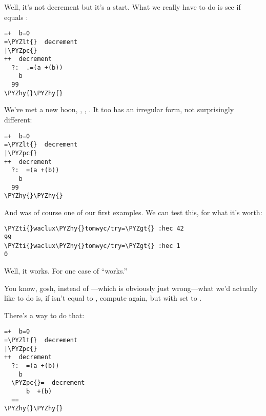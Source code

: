 Well, it's not decrement but it's a start.  What we really have
to do is see if  equals :
\begin{framed_shaded}
\begin{Verbatim}[fontsize=\relsize{-2.5},fontseries=b,commandchars=\\\{\}]
=+  b=0
=\PYZlt{}  decrement
|\PYZpc{}
++  decrement
  ?:  .=(a +(b))
    b
  99
\PYZhy{}\PYZhy{}
\end{Verbatim}
\end{framed_shaded}

We've met a new hoon, , , .  It too has an
irregular form, not surprisingly different:
\begin{framed_shaded}
\begin{Verbatim}[fontsize=\relsize{-2.5},fontseries=b,commandchars=\\\{\}]
=+  b=0
=\PYZlt{}  decrement
|\PYZpc{}
++  decrement
  ?:  =(a +(b))
    b
  99
\PYZhy{}\PYZhy{}
\end{Verbatim}
\end{framed_shaded}

And  was of course one of our first examples.  We can test
this, for what it's worth:

\begin{framed_shaded}
\begin{Verbatim}[fontsize=\relsize{-2.5},fontseries=b,commandchars=\\\{\}]
\PYZti{}waclux\PYZhy{}tomwyc/try=\PYZgt{} :hec 42
99
\PYZti{}waclux\PYZhy{}tomwyc/try=\PYZgt{} :hec 1
0
\end{Verbatim}
\end{framed_shaded}
Well, it works.  For one case of ``works.''

You know, gosh, instead of ---which is obviously just wrong---what we'd actually like to do is, if  isn't equal to ,
compute  again, but with  set to .

There's a way to do that:
\begin{framed_shaded}
\begin{Verbatim}[fontsize=\relsize{-2.5},fontseries=b,commandchars=\\\{\}]
=+  b=0
=\PYZlt{}  decrement
|\PYZpc{}
++  decrement
  ?:  =(a +(b))
    b
  \PYZpc{}=  decrement
      b  +(b)
  ==
\PYZhy{}\PYZhy{}
\end{Verbatim}
\end{framed_shaded}

